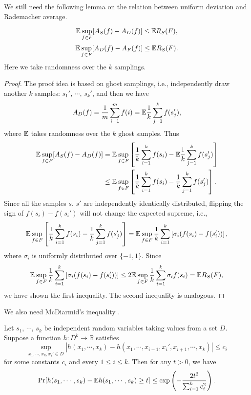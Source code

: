 We still need the following lemma on the relation between uniform deviation and Rademacher average.

\begin{lemma}
\label{lem2}
$$\mathbb{E} \sup_{f\in F} [ A_S(f) - A_D(f) ] \leq \mathbb{E} R_S(F),$$
$$\mathbb{E} \sup_{f\in F} [ A_D(f) - A_F(f) ] \leq \mathbb{E} R_S(F).$$
Here we take randomness over the $k$ samplings.
\end{lemma}
\begin{proof}
The proof idea is based on ghost samplings, i.e., independently draw another $k$ samples: $s_1'$, $\cdots$, $s_k'$, and then we have
$$A_D(f) = \frac{1}{m}\sum_{i=1}^m f(i) = \mathbb{E} \frac{1}{k} \sum_{j=1}^k f(s_j'),$$
where $\mathbb{E}$ takes randomness over the $k$ ghost samples.
Thus
$$\begin{aligned}
\mathbb{E} \sup_{f\in F} [ A_S(f) - A_D(f) ] &= \mathbb{E} \sup_{f\in F} \left[\frac{1}{k} \sum_{i=1}^k f(s_i) - \mathbb{E} \frac{1}{k} \sum_{j=1}^k f(s_j') \right]\\
&\leq \mathbb{E} \sup_{f\in F} \left[\frac{1}{k} \sum_{i=1}^k f(s_i) - \frac{1}{k} \sum_{j=1}^k f(s_j') \right].\\
\end{aligned}$$
Since all the samples $s$, $s'$ are independently identically distributed, flipping the sign of $f(s_i) - f(s_i')$ will not change the expected supreme, i.e.,
$$\mathbb{E} \sup_{f\in F} \left[\frac{1}{k} \sum_{i=1}^k f(s_i) - \frac{1}{k} \sum_{j=1}^k f(s_j') \right] = \mathbb{E} \sup_{f\in F} \frac{1}{k} \sum_{i=1}^k \left[\sigma_i (f(s_i) - f(s_i')) \right],$$
where $\sigma_i$ is uniformly distributed over $\{-1, 1\}$.
Since 
$$\mathbb{E} \sup_{f\in F} \frac{1}{k} \sum_{i=1}^k \left[\sigma_i (f(s_i) - f(s_i')) \right] \leq 2 \mathbb{E} \sup_{f\in F} \frac{1}{k} \sum_{i=1}^k \sigma_i f(s_i)  = \mathbb{E} R_S(F),$$
we have shown the first inequality. The second inequality is analogous.
\end{proof}

We also need McDiarmid's inequality \cite{M89}.
\begin{lemma}
\cite{M89} Let $s_1$, $\cdots$, $s_k$ be independent random variables taking values from a set $D$. Suppose a function $h: D^k \to \mathbb{R}$ satisfies
$$\sup_{x_1,\cdots,x_k,x_i'\in D} |h(x_1,\cdots,x_k) - h(x_1,\cdots,x_{i-1},x_i',x_{i+1},\cdots,x_k)| \leq c_i$$
for some constants $c_i$ and every $1\leq i \leq k$. Then for any $t>0$, we have
$$\Pr[h(s_1,\cdots,s_k) - \mathbb{E} h(s_1,\cdots,s_k) \geq t] \leq \exp\left(-\frac{2t^2}{\sum_{i=1}^k c_i^2}\right).$$
\end{lemma}


